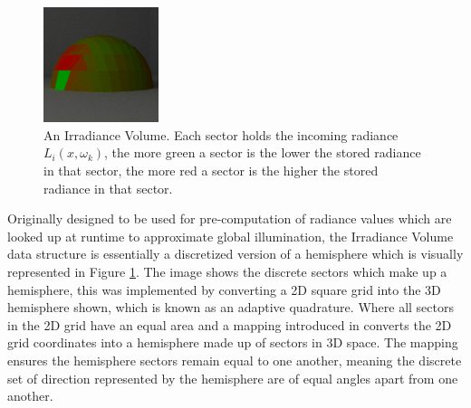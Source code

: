 \documentclass[../dissertation.tex]{subfiles}
\begin{document}
\begin{figure}[h]
\begin{center}
\includegraphics[width=0.3\textwidth]{images/renders/hemispheres/irradiance_volume.png}    
\end{center}
\caption{An Irradiance Volume. Each sector holds the incoming radiance $L_i(x,\omega_k)$, the more green a sector is the lower the stored radiance in that sector, the more red a sector is the higher the stored radiance in that sector. }
\label{fig:irradiance_volume}
\end{figure}

Originally designed to be used for pre-computation of radiance values which are looked up at runtime to approximate global illumination, the Irradiance Volume data structure is essentially a discretized version of a hemisphere which is visually represented in Figure \ref{fig:irradiance_volume}. The image shows the discrete sectors which make up a hemisphere, this was implemented by converting a 2D square grid into the 3D hemisphere shown, which is known as an adaptive quadrature. Where all sectors in the 2D grid have an equal area and a mapping introduced in \cite{shirley1994notes} converts the 2D grid coordinates into a hemisphere made up of sectors in 3D space. The mapping ensures the hemisphere sectors remain equal to one another, meaning the discrete set of direction represented by the hemisphere are of equal angles apart from one another.\\
\end{document}
